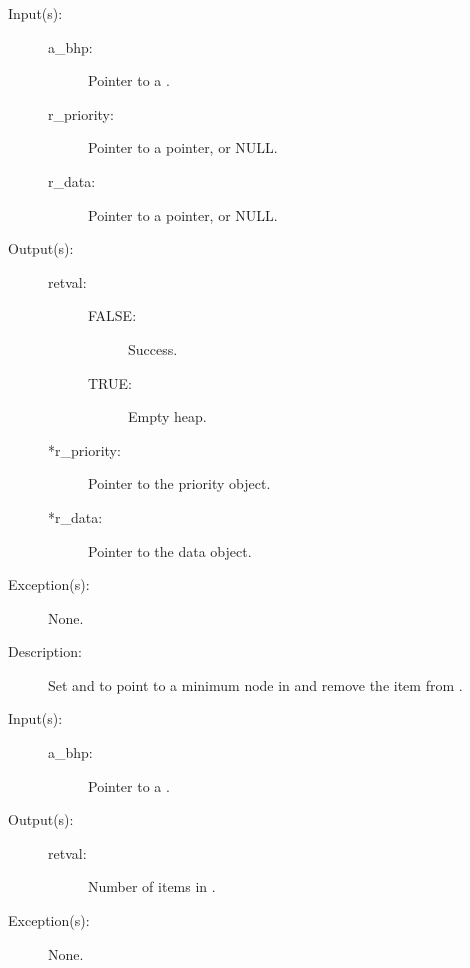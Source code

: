 \begin{description}
\begin{description}
	\item[Input(s): ]
		\begin{description}\item[]
		\item[a\_bhp: ]
			Pointer to a .
		\item[r\_priority: ]
			Pointer to a pointer, or NULL.
		\item[r\_data: ]
			Pointer to a pointer, or NULL.
		\end{description}
	\item[Output(s): ]
		\begin{description}\item[]
		\item[retval: ]
			\begin{description}\item[]
			\item[FALSE: ] Success.
			\item[TRUE: ] Empty heap.
			\end{description}
		\item[*r\_priority: ]
			Pointer to the priority object.
		\item[*r\_data: ]
			Pointer to the data object.
		\end{description}
	\item[Exception(s): ] None.
	\item[Description: ]
		Set  and  to point to a
		minimum node in  and remove the item from
		.
	\end{description}
\label{bhp_size_get}
\item[{\cfunc[cw\_uint64\_t]{bhp\_size\_get}{cw\_bhp\_t *a\_bhp}}: ]
	\begin{description}\item[]
	\item[Input(s): ]
		\begin{description}\item[]
		\item[a\_bhp: ]
			Pointer to a .
		\end{description}
	\item[Output(s): ]
		\begin{description}\item[]
		\item[retval: ]
			Number of items in .
		\end{description}
	\item[Exception(s): ] None.

\end{description}
\end{description}
